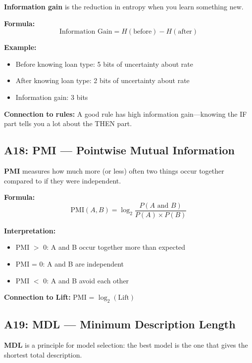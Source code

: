 \documentclass[11pt,a4paper]{article}
\begin{document}
\textbf{Information gain} is the reduction in entropy when you learn something new.

\textbf{Formula:}
\[
\text{Information Gain} = H(\text{before}) - H(\text{after})
\]

\textbf{Example:}
\begin{itemize}
    \item Before knowing loan type: 5 bits of uncertainty about rate
    \item After knowing loan type: 2 bits of uncertainty about rate
    \item Information gain: 3 bits
\end{itemize}

\textbf{Connection to rules:} A good rule has high information gain---knowing the IF part tells you a lot about the THEN part.

\subsection*{A18: PMI --- Pointwise Mutual Information}
\label{A18}

\textbf{PMI} measures how much more (or less) often two things occur together compared to if they were independent.

\textbf{Formula:}
\[
\text{PMI}(A,B) = \log_2 \frac{P(A \text{ and } B)}{P(A) \times P(B)}
\]

\textbf{Interpretation:}
\begin{itemize}
    \item PMI $>$ 0: A and B occur together more than expected
    \item PMI = 0: A and B are independent
    \item PMI $<$ 0: A and B avoid each other
\end{itemize}

\textbf{Connection to Lift:} PMI = $\log_2(\text{Lift})$

\subsection*{A19: MDL --- Minimum Description Length}
\label{A19}

\textbf{MDL} is a principle for model selection: the best model is the one that gives the shortest total description.
\end{document}
